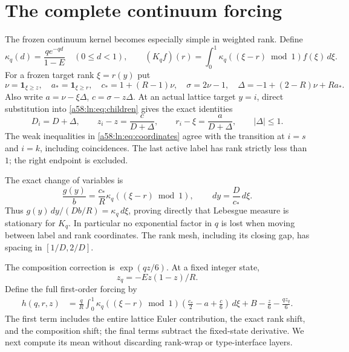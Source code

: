 \documentclass[11pt,letterpaper]{article}
\theoremstyle{remark}
\newcommand{\one}{\mathbf 1}
\newcommand{\dd}{\,d}
\begin{document}
\section{The complete continuum forcing}\label{a58:ln:sec:forcing}
The frozen continuum kernel becomes especially simple in weighted rank.
Define
\[
 \kappa_q(d)=\frac{qe^{-qd}}{1-E}\quad(0\le d<1),\qquad
 (K_qf)(r)=\int_0^1\kappa_q((\xi-r)\bmod1)f(\xi)\dd\xi.
\]
For a frozen target rank $\xi=r(y)$ put
\begin{equation}\label{a58:ln:eq:coordinates}
 \nu=\one_{\xi\ge z},\quad a_*=\one_{\xi\ge r},\quad
 c_*=1+(R-1)\nu,\quad \sigma=2\nu-1,\quad
 \Delta=-1+(2-R)\nu+Ra_*.
\end{equation}
Also write $a=\nu-\xi\Delta$, $c=\sigma-z\Delta$.
At an actual lattice target $y=i$, direct substitution into
\eqref{a58:ln:eq:children} gives the exact identities
\begin{equation}\label{a58:ln:eq:childcoordinates}
 D_i=D+\Delta,\qquad z_i-z=\frac{c}{D+\Delta},\qquad
 r_i-\xi=\frac{a}{D+\Delta},\qquad |\Delta|\le1.
\end{equation}
The weak inequalities in \eqref{a58:ln:eq:coordinates} agree with the transition
at $i=s$ and $i=k$, including coincidences. The last active label has
rank strictly less than $1$; the right endpoint is excluded.

The exact change of variables is
\begin{equation}\label{a58:ln:eq:kernelchange}
 \frac{g(y)}b=\frac{c_*}{R}\kappa_q((\xi-r)\bmod1),
 \qquad \dd y=\frac D{c_*}\dd\xi.
\end{equation}
Thus $g(y)\dd y/(Db/R)=\kappa_q\dd\xi$, proving directly that
Lebesgue measure is stationary for $K_q$. In particular no exponential
factor in $q$ is lost when moving between label and rank coordinates.
The rank mesh, including its closing gap, has spacing in $[1/D,2/D]$.

The composition correction is $\exp(qz/6)$. At a fixed integer state,
\[
 z_q=-Ez(1-z)/R.
\]
Define the full first-order forcing by
\begin{align}\label{a58:ln:eq:forcing}
 h(q,r,z)&=\frac qR\int_0^1\kappa_q((\xi-r)\bmod1)
 \left(\frac{c_*}{2}-a+\frac c6\right)\dd\xi
       +B-\frac z6-\frac{qz_q}6.
\end{align}
The first term includes the entire lattice Euler contribution, the exact
rank shift, and the composition shift; the final terms subtract the
fixed-state derivative. We next compute its mean without discarding
rank-wrap or type-interface layers.
\end{document}
